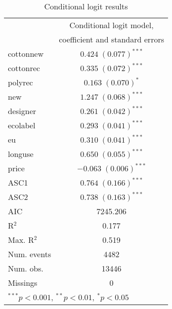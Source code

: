 \begin{table}[ht]
\begin{center}
\begin{tabular}{l c }
\hline
 & Conditional logit model,\\ & coefficient and standard errors \\
\hline
cottonnew   & $0.424 \; (0.077)^{***}$  \\
cottonrec   & $0.335 \; (0.072)^{***}$  \\
polyrec     & $0.163 \; (0.070)^{*}$    \\
new         & $1.247 \; (0.068)^{***}$  \\
designer    & $0.261 \; (0.042)^{***}$  \\
ecolabel    & $0.293 \; (0.041)^{***}$  \\
eu          & $0.310 \; (0.041)^{***}$  \\
longuse     & $0.650 \; (0.055)^{***}$  \\
price       & $-0.063 \; (0.006)^{***}$ \\
ASC1        & $0.764 \; (0.166)^{***}$  \\
ASC2        & $0.738 \; (0.163)^{***}$  \\
\hline
AIC         & 7245.206                  \\
R$^2$       & 0.177                     \\
Max. R$^2$  & 0.519                     \\
Num. events & 4482                      \\
Num. obs.   & 13446                     \\
Missings    & 0                         \\
\hline
\multicolumn{2}{l}{\scriptsize{$^{***}p<0.001$, $^{**}p<0.01$, $^*p<0.05$}}
\end{tabular}
\caption{Conditional logit results}
\label{tab:ConditionalLogitModel}
\end{center}
\end{table}
